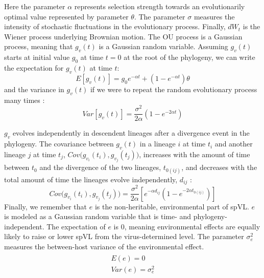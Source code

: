 \documentclass[]{article}
\begin{document}
\begin{doublespace}
Here the parameter $\alpha$ represents selection strength towards an evolutionarily optimal value represented by parameter $\theta$. The parameter $\sigma$ measures the intensity of stochastic fluctuations in the evolutionary process. Finally, $dW_t$ is the Wiener process underlying Brownian motion. The OU process is a Gaussian process, meaning that $g_v(t)$ is a Gaussian random variable. Assuming $g_v(t)$ starts at initial value $g_0$ at time $t = 0$ at the root of the phylogeny, we can write the expectation for $g_v(t)$ at time $t$: 
\begin{equation}
   E[g_v(t)] = g_0e^{-\alpha t} + (1 - e^{-\alpha t})\theta \label{eq:OUmean}
\end{equation}
and the variance in $g_v(t)$ if we were to repeat the random evolutionary process many times \parencite{Butler2004}:
\begin{equation}
    Var[g_v(t)] = \frac{\sigma^2}{2\alpha}(1 - e^{-2\alpha t}) \label{eq:OUVar}
\end{equation}

$g_v$ evolves independently in descendent lineages after a divergence event in the phylogeny. The covariance between $g_v(t)$ in a lineage $i$ at time $t_i$ and another lineage $j$ at time $t_j$, $Cov\big(g_{v_i}(t_i), g_{v_j}(t_j)\big)$, increases with the amount of time between $t_0$ and the divergence of the two lineages, $t_{0(ij)}$, and decreases with the total amount of time the lineages evolve independently, $d_{ij}$ \parencite{Butler2004}: 
\begin{equation}
	Cov\big(g_{v_i}(t_i), g_{v_j}(t_j)\big) = \frac{\sigma^2}{2\alpha}[e^{-\alpha d_{ij}}(1 - e^{-2\alpha t_{0(ij)}})]
	\label{eq:OUcov}
\end{equation}
Finally, we remember that $e$ is the non-heritable, environmental part of spVL. $e$ is modeled as a Gaussian random variable that is time- and phylogeny-independent. The expectation of $e$ is 0, meaning environmental effects are equally likely to raise or lower spVL from the virus-determined level. The parameter $\sigma_e^2$ measures the between-host variance of the environmental effect.
\begin{align}
\begin{split}
	E(e) = 0 \\
	Var(e) = \sigma^2_e
\end{split}
\end{align}


\end{doublespace}
\end{document}
